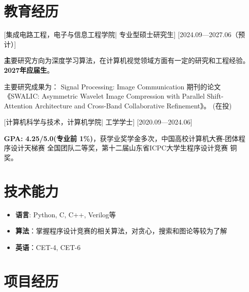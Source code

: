 \documentclass{resume}
\begin{document}
\linespread{1.25}



\ResumeTitle


\section{教育经历}
[\textnormal{集成电路工程，电子与信息工程学院|}  专业型硕士研究生]
[2024.09—2027.06（预计）]

\textbf
主要研究方向为深度学习算法，在计算机视觉领域方面有一定的研究和工程经验。\textbf{2027年应届生}。

主要研究成果为： Signal Processing: Image Communication 期刊的论文《SWALIC: Asymmetric Wavelet Image Compression
with Parallel Shift-Attention Architecture and
Cross-Band Collaborative Refinement》。 (在投)

[\textnormal{计算机科学与技术，计算机学院|} 工学学士]
[2020.09—2024.06]

\textbf{GPA: 4.25/5.0(专业前 1\%)}，获学业奖学金多次，中国高校计算机大赛-团体程序设计天梯赛 全国团队二等奖，第十二届山东省ICPC大学生程序设计竞赛 铜奖。

\section[技术能力]{技术能力}
\begin{itemize}
  \item \textbf{语言}: Python, C, C++, Verilog等
  \item \textbf{算法}：掌握程序设计竞赛的相关算法，对贪心，搜索和图论等较为了解
  \item \textbf{英语}：CET-4, CET-6
\end{itemize}

\section{项目经历}
\end{document}
